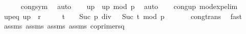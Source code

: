 \begin{isabellebody}
\ \ \ \ \isamarkupfalse%
\ cong{\isacharunderscore}{\kern0pt}sym\ \isamarkupfalse%
\ auto\isanewline
\isanewline
\ \ \isamarkupfalse%
\ {\isachardoublequoteopen}{\isacharbrackleft}{\kern0pt}{\isacharquery}{\kern0pt}up\ {\isacharequal}{\kern0pt}\ {\isacharquery}{\kern0pt}up{\isacharbrackright}{\kern0pt}\ {\isacharparenleft}{\kern0pt}mod\ p{\isacharparenright}{\kern0pt}{\isachardoublequoteclose}\ \isamarkupfalse%
\ auto\isanewline
\ \ \isamarkupfalse%
\ cong{\isacharunderscore}{\kern0pt}up\ mod{\isacharunderscore}{\kern0pt}exp{\isacharunderscore}{\kern0pt}elim\ \isamarkupfalse%
\ up{\isacharunderscore}{\kern0pt}eq{\isacharcolon}{\kern0pt}\ {\isachardoublequoteopen}{\isacharbrackleft}{\kern0pt}{\isacharquery}{\kern0pt}up\ {\isacharequal}{\kern0pt}\ {\isacharparenleft}{\kern0pt}{\isacharparenleft}{\kern0pt}r\ {\isacharcircum}{\kern0pt}\ {}{\isacharparenright}{\kern0pt}\ {\isacharcircum}{\kern0pt}\ {\isacharparenleft}{\kern0pt}{}\ {\isacharcircum}{\kern0pt}\ {\isacharparenleft}{\kern0pt}t\ {\isacharplus}{\kern0pt}\ {}{\isacharparenright}{\kern0pt}{\isacharparenright}{\kern0pt}{\isacharparenright}{\kern0pt}\ {\isacharcircum}{\kern0pt}\ {\isacharparenleft}{\kern0pt}{\isacharparenleft}{\kern0pt}{\isacharparenleft}{\kern0pt}Suc\ p{\isacharparenright}{\kern0pt}\ div\ {}{\isacharparenright}{\kern0pt}\ {\isacharcircum}{\kern0pt}\ {\isacharparenleft}{\kern0pt}Suc\ t{\isacharparenright}{\kern0pt}{\isacharparenright}{\kern0pt}{\isacharbrackright}{\kern0pt}\ {\isacharparenleft}{\kern0pt}mod\ p{\isacharparenright}{\kern0pt}{\isachardoublequoteclose}\ \isanewline
\ \ \ \ \isamarkupfalse%
\ cong{\isacharunderscore}{\kern0pt}trans\ \isamarkupfalse%
\ fast\isanewline
\isanewline
\ \ \isamarkupfalse%
\ assms{\isacharparenleft}{\kern0pt}{}{\isacharparenright}{\kern0pt}\ assms{\isacharparenleft}{\kern0pt}{}{\isacharparenright}{\kern0pt}\ assms{\isacharparenleft}{\kern0pt}{}{\isacharparenright}{\kern0pt}\ assms{\isacharparenleft}{\kern0pt}{}{\isacharparenright}{\kern0pt}\ coprime{\isacharunderscore}{\kern0pt}r{\isacharunderscore}{\kern0pt}sq\ \isamarkupfalse%

\end{isabellebody}
